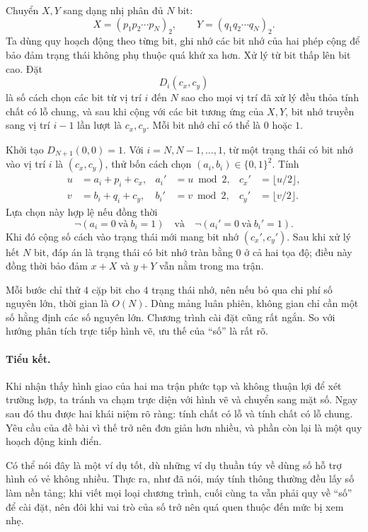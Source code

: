 \documentclass[11pt]{article}
\begin{document}
Chuyển $X,Y$ sang dạng nhị phân đủ $N$ bit:
\[
  X=(p_1p_2\cdots p_N)_2,\qquad
  Y=(q_1q_2\cdots q_N)_2.
\]
Ta dùng quy hoạch động theo từng bit, ghi nhớ các bit nhớ của hai phép cộng
để bảo đảm trạng thái không phụ thuộc quá khứ xa hơn. Xử lý từ bit thấp lên
bit cao. Đặt
\[
  D_i(c_x,c_y)
\]
là số cách chọn các bit từ vị trí $i$ đến $N$ sao cho mọi vị trí đã xử lý
đều thỏa tính chất có lỗ chung, và sau khi cộng với các bit tương ứng của
$X,Y$, bit nhớ truyền sang vị trí $i-1$ lần lượt là $c_x,c_y$. Mỗi bit nhớ
chỉ có thể là $0$ hoặc $1$.

Khởi tạo $D_{N+1}(0,0)=1$. Với $i=N,N-1,\ldots,1$, từ một trạng thái có bit
nhớ vào vị trí $i$ là $(c_x,c_y)$, thử bốn cách chọn $(a_i,b_i)\in\{0,1\}^2$.
Tính
\[
\begin{aligned}
  u&=a_i+p_i+c_x,& a_i'&=u\bmod 2,& c_x'&=\lfloor u/2\rfloor,\\
  v&=b_i+q_i+c_y,& b_i'&=v\bmod 2,& c_y'&=\lfloor v/2\rfloor.
\end{aligned}
\]
Lựa chọn này hợp lệ nếu đồng thời
\[
  \neg(a_i=0\ \text{và}\ b_i=1)
  \quad\text{và}\quad
  \neg(a_i'=0\ \text{và}\ b_i'=1).
\]
Khi đó cộng số cách vào trạng thái mới mang bit nhớ $(c_x',c_y')$. Sau khi
xử lý hết $N$ bit, đáp án là trạng thái có bit nhớ tràn bằng $0$ ở cả hai
tọa độ; điều này đồng thời bảo đảm $x+X$ và $y+Y$ vẫn nằm trong ma trận.

Mỗi bước chỉ thử $4$ cặp bit cho $4$ trạng thái nhớ, nên nếu bỏ qua chi phí
số nguyên lớn, thời gian là $O(N)$. Dùng mảng luân phiên, không gian chỉ cần
một số hằng định các số nguyên lớn. Chương trình cài đặt cũng rất ngắn. So
với hướng phân tích trực tiếp hình vẽ, ưu thế của ``số'' là rất rõ.

\paragraph{Tiểu kết.}
Khi nhận thấy hình giao của hai ma trận phức tạp và không thuận lợi để xét
trường hợp, ta tránh va chạm trực diện với hình vẽ và chuyển sang mặt số.
Ngay sau đó thu được hai khái niệm rõ ràng: tính chất có lỗ và tính chất có
lỗ chung. Yêu cầu của đề bài vì thế trở nên đơn giản hơn nhiều, và phần còn
lại là một quy hoạch động kinh điển.

Có thể nói đây là một ví dụ tốt, dù những ví dụ thuần túy về dùng số hỗ trợ
hình có vẻ không nhiều. Thực ra, như đã nói, máy tính thông thường đều lấy
số làm nền tảng; khi viết mọi loại chương trình, cuối cùng ta vẫn phải quy
về ``số'' để cài đặt, nên đôi khi vai trò của số trở nên quá quen thuộc đến
mức bị xem nhẹ.
\end{document}
